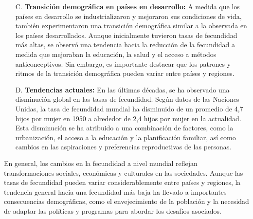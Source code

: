 \documentclass[8pt,a4paper]{beamer}
\begin{document}
{\begin{frame}{}
\begin{block}{}
\begin{enumerate}
\item[C.] \textbf{Transición demográfica en países en desarrollo:} A medida que los países en desarrollo se industrializaron y mejoraron sus condiciones de vida, también experimentaron una transición demográfica similar a la observada en los países desarrollados. Aunque inicialmente tuvieron tasas de fecundidad más altas, se observó una tendencia hacia la reducción de la fecundidad a medida que mejoraban la educación, la salud y el acceso a métodos anticonceptivos. Sin embargo, es importante destacar que los patrones y ritmos de la transición demográfica pueden variar entre países y regiones.

\end{enumerate}

\end{block}
\end{frame}

\begin{frame}{}

\begin{block}{}
\setlength{\parskip}{3px}
\justifying
\begin{enumerate}
\setlength{\parskip}{3px}
\justifying
\item[D.] \textbf{Tendencias actuales:} En las últimas décadas, se ha observado una disminución global en las tasas de fecundidad. Según datos de las Naciones Unidas, la tasa de fecundidad mundial ha disminuido de un promedio de 4,7 hijos por mujer en 1950 a alrededor de 2,4 hijos por mujer en la actualidad. Esta disminución se ha atribuido a una combinación de factores, como la urbanización, el acceso a la educación y la planificación familiar, así como cambios en las aspiraciones y preferencias reproductivas de las personas.
\end{enumerate}
En general, los cambios en la fecundidad a nivel mundial reflejan transformaciones sociales, económicas y culturales en las sociedades. Aunque las tasas de fecundidad pueden variar considerablemente entre países y regiones, la tendencia general hacia una fecundidad más baja ha llevado a importantes consecuencias demográficas, como el envejecimiento de la población y la necesidad de adaptar las políticas y programas para abordar los desafíos asociados.
\end{block}
\end{frame}


}
\end{document}
